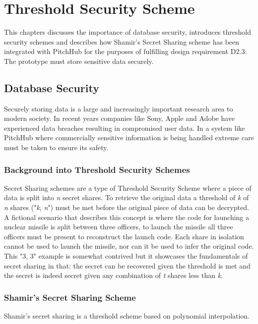 \chapter{Threshold Security Scheme}\label{C:threshholdSecurity}
This chapters discusses the importance of database security, introduces threshold security schemes and describes how Shamir's Secret Sharing scheme has been integrated with PitchHub for the purposes of fulfilling design requirement D2.3: The prototype must store sensitive data securely.

\section{Database Security}\label{S:databaseSecurity}
Securely storing data is a large and increasingly important research area to modern society. In recent years companies like Sony, Apple and Adobe have experienced data breaches resulting in compromised user data. In a system like PitchHub where commercially sensitive information is being handled extreme care must be taken to ensure its safety. 

\subsection{Background into Threshold Security Schemes}
Secret Sharing schemes are a type of Threshold Security Scheme where a piece of data is split into \textit{n} secret shares. To retrieve the original data a threshold of \textit{k} of \textit{n} shares ("\textit{k}, \textit{n}") must be met before the original piece of data can be decrypted. A fictional scenario that describes this concept is where the code for launching a nuclear missile is split between three officers, to launch the missile all three officers must be present to reconstruct the launch code. Each share in isolation cannot be used to launch the missile, nor can it be used to infer the original code. This "3, 3" example is somewhat contrived but it showcases the fundamentals of secret sharing in that: the secret can be recovered given the threshold is met and the secret is indeed secret given any combination of \textit{t} shares less than \textit{k}.

\subsection{Shamir's Secret Sharing Scheme}
Shamir's secret sharing \cite{shamir1979share} is a threshold scheme based on polynomial interpolation. 

